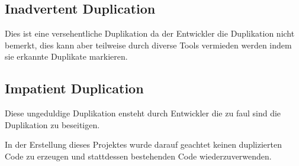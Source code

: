 \subsection{Inadvertent Duplication}
Dies ist eine versehentliche Duplikation da der Entwickler die Duplikation nicht bemerkt,
dies kann aber teilweise durch diverse Tools vermieden werden indem sie erkannte Duplikate markieren.
\subsection{Impatient Duplication}
Diese ungeduldige Duplikation ensteht durch Entwickler die zu faul sind die Duplikation zu beseitigen.

In der Erstellung dieses Projektes wurde darauf geachtet keinen duplizierten Code zu erzeugen und stattdessen bestehenden Code wiederzuverwenden.

